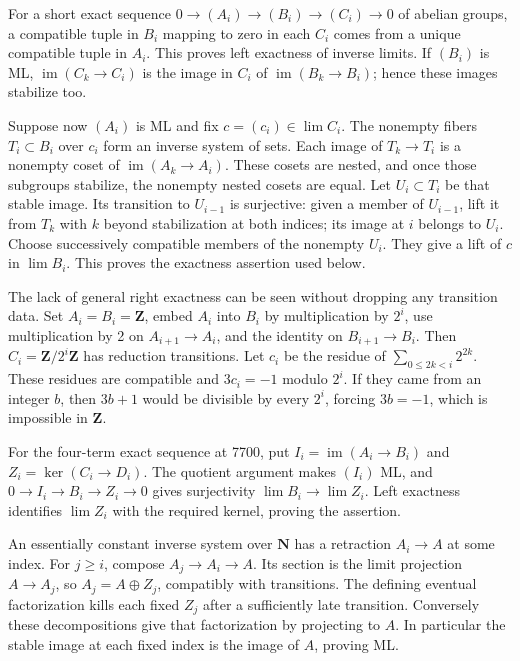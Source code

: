 For a short exact sequence \(0\to(A_i)\to(B_i)\to(C_i)\to0\) of abelian groups, a compatible tuple in \(B_i\) mapping to zero in each \(C_i\) comes from a unique compatible tuple in \(A_i\). This proves left exactness of inverse limits. If \((B_i)\) is ML, \(\operatorname{im}(C_k\to C_i)\) is the image in \(C_i\) of \(\operatorname{im}(B_k\to B_i)\); hence these images stabilize too.

Suppose now \((A_i)\) is ML and fix \(c=(c_i)\in\lim C_i\). The nonempty fibers \(T_i\subset B_i\) over \(c_i\) form an inverse system of sets. Each image of \(T_k\to T_i\) is a nonempty coset of \(\operatorname{im}(A_k\to A_i)\). These cosets are nested, and once those subgroups stabilize, the nonempty nested cosets are equal. Let \(U_i\subset T_i\) be that stable image. Its transition to \(U_{i-1}\) is surjective: given a member of \(U_{i-1}\), lift it from \(T_k\) with \(k\) beyond stabilization at both indices; its image at \(i\) belongs to \(U_i\). Choose successively compatible members of the nonempty \(U_i\). They give a lift of \(c\) in \(\lim B_i\). This proves the exactness assertion used below.

The lack of general right exactness can be seen without dropping any transition data. Set \(A_i=B_i=\mathbf Z\), embed \(A_i\) into \(B_i\) by multiplication by \(2^i\), use multiplication by 2 on \(A_{i+1}\to A_i\), and the identity on \(B_{i+1}\to B_i\). Then \(C_i=\mathbf Z/2^i\mathbf Z\) has reduction transitions. Let \(c_i\) be the residue of \(\sum_{0\leq 2k<i}2^{2k}\). These residues are compatible and \(3c_i=-1\) modulo \(2^i\). If they came from an integer \(b\), then \(3b+1\) would be divisible by every \(2^i\), forcing \(3b=-1\), which is impossible in \(\mathbf Z\).

For the four-term exact sequence at 7700, put \(I_i=\operatorname{im}(A_i\to B_i)\) and \(Z_i=\ker(C_i\to D_i)\). The quotient argument makes \((I_i)\) ML, and \(0\to I_i\to B_i\to Z_i\to0\) gives surjectivity \(\lim B_i\to\lim Z_i\). Left exactness identifies \(\lim Z_i\) with the required kernel, proving the assertion.

An essentially constant inverse system over \(\mathbf N\) has a retraction \(A_i\to A\) at some index. For \(j\geq i\), compose \(A_j\to A_i\to A\). Its section is the limit projection \(A\to A_j\), so \(A_j=A\oplus Z_j\), compatibly with transitions. The defining eventual factorization kills each fixed \(Z_j\) after a sufficiently late transition. Conversely these decompositions give that factorization by projecting to \(A\). In particular the stable image at each fixed index is the image of \(A\), proving ML.


